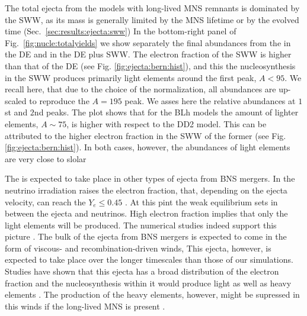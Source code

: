 The total ejecta from the models with long-lived \ac{MNS} remnants is dominated by
the \ac{SWW}, as its mass is generally limited by the \ac{MNS} lifetime 
or by the evolved time (Sec.~\ref{sec:results:ejecta:sww})
In the bottom-right panel of Fig.~\ref{fig:nucle:totalyields} we show separately the 
final abundances from the \rproc{} in the \ac{DE} and in the \ac{DE} plus \ac{SWW}. 
The electron fraction of the \ac{SWW} is higher than that of the \ac{DE} 
(see Fig. \ref{fig:ejecta:bern:hist}), and this the \rproc{} nucleosynthesis in the 
\ac{SWW} produces primarily light elements around the first \rproc{} peak, $A<95$.
We recall here, that due to the choice of the normalization, all abundances are up-scaled 
to reproduce the $A=195$ peak. We asses here the relative abundances at $1$st and $2$nd
\rproc{} peaks.
The plot shows that for the BLh models the amount of lighter elements, $A\sim75$, is higher with 
respect to the DD2 model. This can be attributed to the higher electron fraction in the 
\ac{SWW} of the former (see Fig. \ref{fig:ejecta:bern:hist}).
In both cases, however, the abundances of light elements are very close to slolar 

The \rproc{} is expected to take place in other types of ejecta from \ac{BNS} mergers.
In \nwind{} the neutrino irradiation raises the electron fraction, that, depending 
on the ejecta velocity, can reach the $Y_e\leq 0.45$ \citep{Qian:1996xt}. 
At this pint the weak equilibrium sets in between the ejecta and neutrinos.
High electron fraction implies that only the light elements will be produced.
The numerical studies indeed support this picture 
\citep{Dessart:2008zd,Perego:2014fma,Just:2014fka,Martin:2015hxa,Foucart:2016rxm}. 
The bulk of the ejecta from \ac{BNS} mergers is expected to come in the form of 
viscous- and recombination-driven winds, This ejecta, however, is expected to take 
place over the longer timescales than those of our simulations.
Studies have shown that this ejecta has a broad distribution of the electron fraction 
and the \rproc{} nucleosynthesis within it would produce light as well as heavy elements
\citep{Fernandez:2013tya,Just:2014fka,Wu:2016pnw,Siegel:2017nub,Fujibayashi:2017puw,Fernandez:2018kax}.
The production of the heavy \rproc{} elements, however, might be supressed in this winds
if the long-lived \ac{MNS} is present \citep{Metzger:2014ila,Lippuner:2017bfm}.






